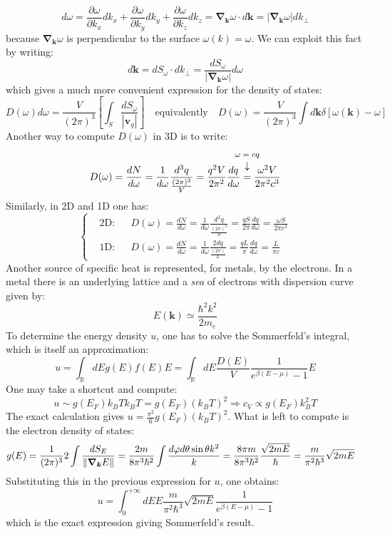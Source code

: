 \documentclass[10.75pt,a4paper,openright,bottom=2cm]{article}
\renewcommand{\Vec}[1]{\boldsymbol{#1}}
\begin{document}
\[
d\omega=\frac{\partial\omega}{\partial k_x}dk_x+\frac{\partial\omega}{\partial k_y}dk_y+\frac{\partial\omega}{\partial k_z}dk_z=\Vec{\nabla}_{\Vec{k}}\omega\cdot d\Vec{k}=|\Vec{\nabla}_{\Vec{k}}\omega|dk_\perp
\]
because $\Vec{\nabla}_{\Vec{k}}\omega$ is perpendicular to the surface $\omega(k)=\omega$. We can exploit this fact by writing: 
\[
d\Vec{k}=dS_\omega\cdot dk_\perp=\frac{dS_\omega}{|\Vec{\nabla}_{\Vec{k}}\omega|}d\omega
\]
which gives a much more convenient expression for the density of states:
\[
D(\omega)d\omega=\frac{V}{(2\pi)^3}\left[\int_S\frac{dS_\omega}{|\Vec{v}_g|}\right] \quad \text{equivalently} \quad D(\omega)=\frac{V}{(2\pi)^3}\int d\Vec{k}\delta[\omega(\Vec{k})-\omega]
\]
Another way to compute $D(\omega)$ in 3D is to write:
\[
D(\omega)=\frac{dN}{d\omega}=\frac{1}{d\omega}\frac{d^3q}{\frac{(2\pi)^3}{V}}=\frac{q^2V}{2\pi^2}\frac{dq}{d\omega}\overset{\mathclap{\tikz \node {$\downarrow$} node [above=1ex] {\footnotesize $\omega=cq$};}}{=}\frac{\omega^2V}{2\pi^2c^3}
\]
Similarly, in 2D and 1D one has:
\[
\left\{
\begin{aligned}
&\text{2D:} &&D(\omega)=\frac{dN}{d\omega}=\frac{1}{d\omega}\frac{d^2q}{\frac{(2\pi)^2}{S}}=\frac{qS}{2\pi}\frac{dq}{d\omega}=\frac{\omega S}{2\pi c^2}\\
&\text{1D:} &&D(\omega)=\frac{dN}{d\omega}=\frac{1}{d\omega}\frac{2dq}{\frac{(2\pi)}{L}}=\frac{qL}{\pi}\frac{dq}{d\omega}=\frac{L}{\pi c}
\end{aligned}
\right.
\]
Another source of specific heat is represented, for metals, by the electrons. In a metal there is an underlying lattice and a \textit{sea} of electrons with dispersion curve given by:
\[
E(\Vec{k})\simeq\frac{\hbar^2k^2}{2m_e}
\]
To determine the energy density $u$, one has to solve the Sommerfeld's integral, which is itself an approximation:
\[
u=\int_\mathbb{R}dEg(E)f(E)E=\int_\mathbb{R}dE\frac{D(E)}{V}\frac{1}{e^{\beta(E-\mu)}-1}E
\]
One may take a shortcut and compute:
\[
u\sim g(E_F)k_BTk_BT=g(E_F)(k_BT)^2\Rightarrow c_V\propto g(E_F)k_B^2T
\]
The exact calculation gives $u=\frac{\pi^2}{6}g(E_F)(k_BT)^2$. What is left to compute is the electron density of states:
\begin{align*}
g(E)&=\frac{1}{(2\pi)^3}2\int\frac{dS_E}{\norm{\Vec{\nabla}_{\Vec{k}}E}}=\frac{2 m}{8\pi^3\hbar^2}\int\frac{d\varphi d\theta\sin\theta k^2}{k}=\frac{8\pi m}{8\pi^3\hbar^2}\frac{\sqrt{2mE}}{\hbar}=\frac{m}{\pi^2\hbar^3}\sqrt{2mE}
\end{align*}
Substituting this in the previous expression for $u$, one obtains:
\[
u=\int_0^{+\infty}dEE\frac{m}{\pi^2\hbar^3}\sqrt{2mE}\frac{1}{e^{\beta(E-\mu)}-1}
\]
which is the exact expression giving Sommerfeld's result.
\newpage
\end{document}
